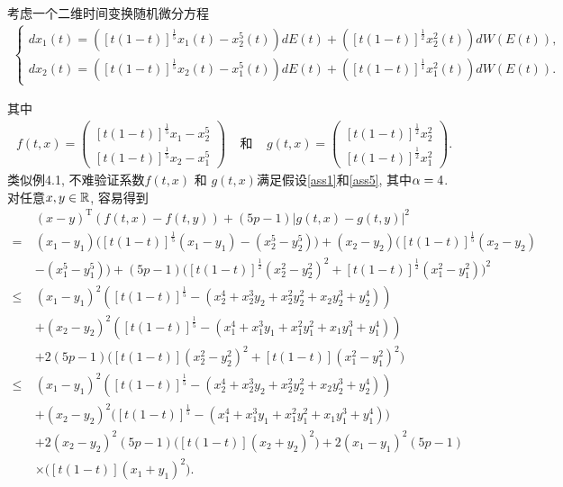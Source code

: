 \begin{example}\label{exp}
   考虑一个二维时间变换随机微分方程
    \begin{align}
        \label{ex2}
        \left\{
        \begin{array}{lr}
            dx_1(t)=\left([t(1-t)]^{\frac{1}{5}}x_1(t)-x_2^5(t)\right)dE(t)+\left([t(1-t)]^{\frac{1}{2}}x_2^2(t)\right)dW(E(t)),&\\
            dx_2(t)=\left([t(1-t)]^{\frac{1}{5}}x_2(t)-x_1^5(t)\right)dE(t)+\left([t(1-t)]^{\frac{1}{1}}x_1^2(t)\right)dW(E(t)).&
        \end{array}
        \right.
    \end{align}
\end{example}
其中
\begin{align*}
    f(t,x)=
    \begin{pmatrix}
        [t(1-t)]^{\frac{1}{5}}x_1-x_2^5\\
        [t(1-t)]^{\frac{1}{5}}x_2-x_1^5
    \end{pmatrix}
    ~~~~~\text{和}~~~~~
    g(t,x)=
    \begin{pmatrix}
        [t(1-t)]^{\frac{1}{2}}x_2^2\\
        [t(1-t)]^{\frac{1}{2}}x_1^2
    \end{pmatrix}.
\end{align*}
类似例4.1, 不难验证系数$f(t,x)$ 和 $g(t,x)$满足假设\ref{ass1}和\ref{ass5}, 其中$\alpha=4$. 对任意$x,y\in\mathbb{R}$, 容易得到
\begin{align*}
    &(x-y)^{\mathrm{T}}(f(t,x)-f(t,y))+(5p-1)|g(t,x)-g(t,y)|^2\\
    = & (x_1-y_1)\bigg([t(1-t)]^{\frac{1}{5}}(x_1-y_1)-(x_2^5-y_2^{5})\bigg)+(x_2-y_2)\bigg([t(1-t)]^{\frac{1}{5}}(x_2-y_2)\\
    \quad &-(x_1^5-y_1^{5})\bigg)+(5p-1)\bigg([t(1-t)]^{\frac{1}{2}}(x_2^2-y_2^2)^2
    +[t(1-t)]^{\frac{1}{2}}(x_1^2-y_1^2)\bigg)^2\\
    \leq & (x_1-y_1)^2\left([t(1-t)]^{\frac{1}{5}}-(x_2^4+x_2^3y_2+x_2^2y_2^2+x_2y_2^3+y_2^4)\right)\\
    \quad &+(x_2-y_2)^2\left([t(1-t)]^{\frac{1}{5}}-(x_1^4+x_1^3y_1+x_1^2y_1^2+x_1y_1^3+y_1^4)\right)\\
    \quad &+2(5p-1)\bigg([t(1-t)](x_2^2-y_2^2)^2+[t(1-t)](x_1^2-y_1^2)^2\bigg)\\
    \leq & (x_1-y_1)^2\left([t(1-t)]^{\frac{1}{5}}-(x_2^4+x_2^3y_2+x_2^2y_2^2+x_2y_2^3+y_2^4)\right)\\
    \quad &+(x_2-y_2)^2\bigg([t(1-t)]^{\frac{1}{5}}-(x_1^4+x_1^3y_1+x_1^2y_1^2+x_1y_1^3+y_1^4)\bigg)\\
    \quad &+2(x_2-y_2)^{2}(5p-1)\bigg([t(1-t)](x_2+y_2)^2\bigg)+2(x_1-y_1)^{2}(5p-1)\\
    & \times\bigg([t(1-t)](x_1+y_1)^2\bigg).
\end{align*}
